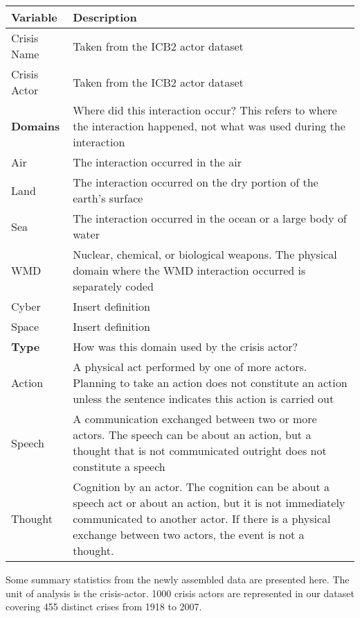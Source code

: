 \documentclass[12pt,letterpaper]{article}
\begin{document}
		\begin{table}[h]
			\centering
			\begin{tabular}{|l|p{14cm}|}
				\hline
				\textbf{Variable} & \textbf{Description} \\ 
				\hline
				\hline
				Crisis Name & Taken from the ICB2 actor dataset \\
				Crisis Actor & Taken from the ICB2 actor dataset \\
				\hline
				\textbf{Domains} & Where did this interaction occur? This refers to where the interaction happened, not what was used during the interaction \\
				Air &  The interaction occurred in the air \\
				Land & The interaction occurred on the dry portion of the earth's surface \\
				Sea & The interaction occurred in the ocean or a large body of water \\
				WMD & Nuclear, chemical, or biological weapons. The physical domain where the WMD interaction occurred is separately coded \\
				Cyber & Insert definition \\
				Space & Insert definition \\
				\hline
				\textbf{Type} & How was this domain used by the crisis actor? \\
				Action & A physical act performed by one of more actors. Planning to take an action does not constitute an action unless the sentence indicates this action is carried out \\
				Speech & A communication exchanged between two or more actors. The speech can be about an action, but a thought that is not communicated outright does not constitute a speech \\
				Thought & Cognition by an actor. The cognition can be about a speech act or about an action, but it is not immediately communicated to another actor. If there is a physical exchange between two actors, the event is not a thought. \\
				\hline
			\end{tabular}
			\label{tab:variable_summary}
		\end{table}

		Some summary statistics from the newly assembled data are presented here. The unit of analysis is the crisis-actor. 1000 crisis actors are represented in our dataset covering 455 distinct crises from 1918 to 2007.
		
\end{document}
